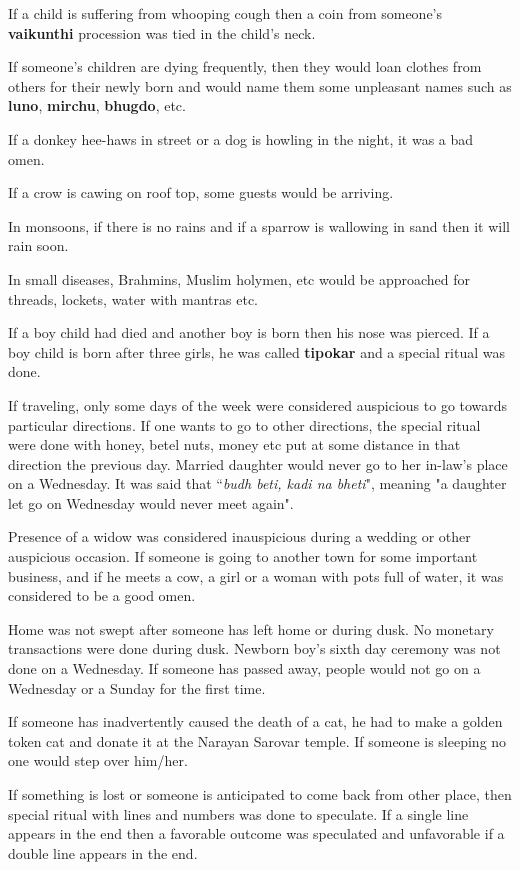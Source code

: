 If a child is suffering from whooping cough then a coin from someone's
\textbf{vaikunthi} procession was tied in the child's neck. 

If someone's children are dying frequently, then they would loan clothes from
others for their newly born and would name them some unpleasant names such as
\textbf{luno}, \textbf{mirchu}, \textbf{bhugdo}, etc.

If a donkey hee-haws in street or a dog is howling in the night, it was a bad
omen.

If a crow is cawing on roof top, some guests would be arriving.

In monsoons, if there is no rains and if a sparrow is wallowing in sand then it
will rain soon.

In small diseases, Brahmins, Muslim holymen, etc would be approached for
threads, lockets, water with mantras etc.

If a boy child had died and another boy is born then his nose was pierced. If a
boy child is born after three girls, he was called \textbf{tipokar} and a
special ritual was done.

If traveling, only some days of the week were considered auspicious to go
towards particular directions. If one wants to go to other directions, the
special ritual were done with honey, betel nuts, money etc put at some distance
in that direction the previous day. Married daughter would never go to her
in-law's place on a Wednesday. It was said that ``\textit{budh beti, kadi na
bheti}", meaning "a daughter let go on Wednesday would never meet again".

Presence of a widow was considered inauspicious during a wedding or other
auspicious occasion. If someone is going to another town for some important
business, and if he meets a cow, a girl or a woman with pots full of water, it
was considered to be a good omen.

Home was not swept after someone has left home or during dusk. No monetary
transactions were done during dusk. Newborn boy's sixth day ceremony was not
done on a Wednesday. If someone has passed away, people would not go on a
Wednesday or a Sunday for the first time.

If someone has inadvertently caused the death of a cat, he had to make a golden
token cat and donate it at the Narayan Sarovar temple. If someone is sleeping
no one would step over him/her.

If something is lost or someone is anticipated to come back from other place,
then special ritual with lines and numbers was done to speculate. If a single
line appears in the end then a favorable outcome was speculated and unfavorable
if a double line appears in the end. 

